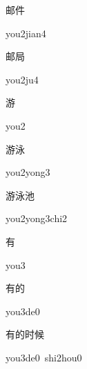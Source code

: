 \begin{multicols*}{2}
\begin{verbete}{邮件}
\begin{pronuncia}{you2jian4}
\end{pronuncia}
\end{verbete}

\begin{verbete}[you2ju4]{邮局}
\begin{pronuncia}{you2ju4}
\end{pronuncia}
\end{verbete}

\begin{verbete}[you2]{游}
\begin{pronuncia}{you2}
\end{pronuncia}
\end{verbete}

\begin{verbete}{游泳}
\begin{pronuncia}{you2yong3}
\end{pronuncia}
\end{verbete}

\begin{verbete}{游泳池}
\begin{pronuncia}{you2yong3chi2}
\end{pronuncia}
\end{verbete}

\begin{verbete}[you3]{有}
\begin{pronuncia}{you3}
\end{pronuncia}
\end{verbete}

\begin{verbete}[you3de0]{有的}
\begin{pronuncia}{you3de0}
\end{pronuncia}
\end{verbete}

\begin{verbete}{有的时候}
\begin{pronuncia}{you3de0\ shi2hou0}
\end{pronuncia}
\end{verbete}


\end{multicols*}
